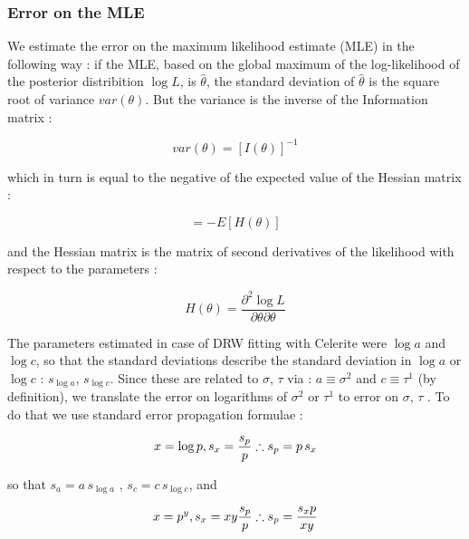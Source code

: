 \documentclass[fleqn,usenatbib]{mnras}  %
\begin{document}
\subsubsection{Error on the MLE}

We estimate the error on the maximum likelihood estimate (MLE) in  the following way : if the MLE, based on the global maximum of the log-likelihood of the posterior distribition $\log{L}$, is $\hat{\theta}$, the standard deviation of $\hat{\theta}$ is the square root of variance $var(\theta)$. But the variance is the inverse of the Information  matrix :

\begin{equation}
var(\theta) = [I(\theta)]^{-1}
\end{equation}

which in turn is equal to the negative of the expected value of the Hessian matrix : 

\begin{equation}
[I(\theta)] = -E[H(\theta)]
\end{equation}

and the Hessian matrix is  the matrix of second derivatives of the likelihood with respect to the parameters : 

\begin{equation}
H(\theta) = \frac{\partial^{2}\log{L}}{\partial \theta \partial \theta }
\end{equation}


The parameters estimated in case of DRW fitting with Celerite were $\log{a}$ and $\log{c}$, so that the standard deviations describe the standard deviation in $\log{a}$ or $\log{c}$ :  $s_{\log{a}}$, $s_{\log{c}}$.  Since these are related to $\sigma$, $\tau$ via : $a \equiv \sigma^{2}$ and $c \equiv \tau^{1}$ (by definition), we translate the error on logarithms of $\sigma^{2}$ or $\tau^{1}$ to error  on $\sigma$, $\tau$ . To do that we use standard error propagation formulae : 

\begin{equation}
x = \log{p} , \\ 
s_{x} = \frac{s_{p}}{p} \\
\therefore s_{p}  = p \,s_{x}
\end{equation}

so that   $s_{a} = a\, s_{\log{a}} $ , $s_{c} = c\, s_{\log{c}}$, and 


\begin{equation}
x = p^{y} , \\ 
s_{x} = xy \frac{s_{p}}{p} \\
\therefore s_{p} = \frac{s_{x}p}{xy }
\end{equation}
\end{document}
